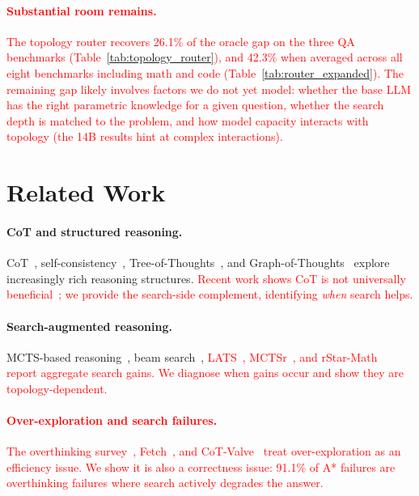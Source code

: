 \documentclass[11pt]{article}
\begin{document}
\textcolor{red}{\paragraph{Substantial room remains.}
The topology router recovers 26.1\% of the oracle gap on the three QA benchmarks (Table~\ref{tab:topology_router}), and 42.3\% when averaged across all eight benchmarks including math and code (Table~\ref{tab:router_expanded}). The remaining gap likely involves factors we do not yet model: whether the base LLM has the right parametric knowledge for a given question, whether the search depth is matched to the problem, and how model capacity interacts with topology (the 14B results hint at complex interactions).}






\section{Related Work}
\label{sec:related}

\paragraph{CoT and structured reasoning.}
CoT~\cite{wei2022chain}, self-consistency~\cite{wang2022self}, Tree-of-Thoughts~\cite{yao2024tree}, and Graph-of-Thoughts~\cite{besta2024graph} explore increasingly rich reasoning structures. \textcolor{red}{Recent work shows CoT is not universally beneficial~\cite{meincke2025cot}; we provide the search-side complement, identifying \emph{when} search helps.}

\paragraph{Search-augmented reasoning.}
MCTS-based reasoning~\cite{hao2023reasoning}, beam search~\cite{xie2024self}, \textcolor{red}{LATS~\cite{zhou2024lats}, MCTSr~\cite{zhang2024mctsrmath}, and rStar-Math~\cite{guan2025rstar} report aggregate search gains. We diagnose when gains occur and show they are topology-dependent.}

\textcolor{red}{\paragraph{Over-exploration and search failures.}
The overthinking survey~\cite{sui2025overthinking}, Fetch~\cite{wang2025fetch}, and CoT-Valve~\cite{ma2025cotvalve} treat over-exploration as an efficiency issue. We show it is also a correctness issue: 91.1\% of A* failures are overthinking failures where search actively degrades the answer.}
\end{document}
